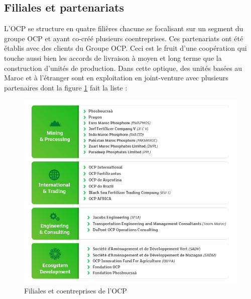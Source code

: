 	\subsection{Filiales et partenariats}
	L'OCP se structure en quatre filières chacune se focalisant sur un segment du groupe OCP et ayant co-créé plusieurs coentreprises. Ces partenariats ont été établis avec des clients du Groupe OCP. Ceci est le fruit d’une coopération qui touche aussi bien les accords de livraison à moyen et long terme que la
	construction d'unités de production. Dans cette optique, des unités basées au Maroc et à
	l'étranger sont en exploitation en joint-venture avec plusieurs partenaires dont la figure \ref{fig:mesh1} fait la liste : 
	\begin{figure}[h]
    		\centering
    		\includegraphics[scale=0.62]{Companies-ocp}
    		\caption{Filiales et coentreprises de l’OCP \cite{ocp-fil}}
    		\label{fig:mesh1}
	\end{figure}
